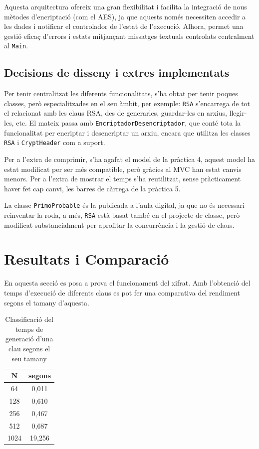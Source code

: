 \documentclass{ieeetj}
\begin{document}
Aquesta arquitectura ofereix una gran flexibilitat i facilita la integració de nous mètodes d'encriptació (com el AES), ja que aquests només necessiten accedir a les dades i notificar el controlador de l'estat de l'execució. Alhora, permet una gestió eficaç d'errors i estats mitjançant missatges textuals controlats centralment al \texttt{Main}.


\subsection{Decisions de disseny i extres implementats}
Per tenir centralitzat les diferents funcionalitats, s'ha obtat per tenir poques classes, però especialitzades en el seu àmbit, per exemple: \texttt{RSA} s'encarrega de tot el relacionat amb les claus RSA, des de generarles, guardar-les en arxius, llegir-les, etc. El mateix passa amb \texttt{EncriptadorDesencriptador}, que conté tota la funcionalitat per encriptar i desencriptar un arxiu, encara que utilitza les classes \texttt{RSA} i \texttt{CryptHeader} com a suport.

Per a l'extra de comprimir, s'ha agafat el model de la pràctica 4, aquest model ha estat modificat per ser més compatible, però gràcies al MVC han estat canvis menors.
Per a l'extra de mostrar el temps s'ha reutilitzat, sense pràcticament haver fet cap canvi, les barres de càrrega de la pràctica 5.

La classe \texttt{PrimoProbable} és la publicada a l'aula digital, ja que no és necessari reinventar la roda, a més, \texttt{RSA} està basat també en el projecte de classe, però modificat substancialment per aprofitar la concurrència i la gestió de claus. 

\section{Resultats i Comparació} 
En aquesta secció es posa a prova el funcionament del xifrat. Amb l'obtenció del temps d'execució de diferents claus es pot fer una comparativa del rendiment segons el tamany d'aquesta.




\begin{table}[H]
\centering
\caption{Classificació del temps de generació d'una clau segons el seu tamany}
\label{tab:xarxa}
\begin{tabular}{|c|c|}
\hline
\textbf{N} & \textbf{segons}  \\
\hline
64  & 0,011   \\
128  & 0,610   \\
256 & 0,467      \\
512 & 0,687   \\
1024 & 19,256       \\
\hline
\end{tabular}
\end{table}
\end{document}

